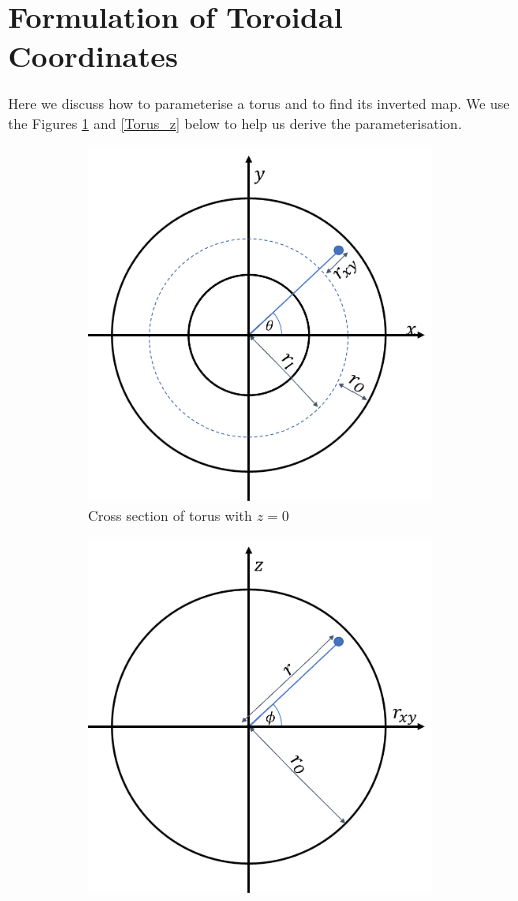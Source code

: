 \documentclass[12pt]{ociamthesis}
\begin{document}
\section{Formulation of Toroidal Coordinates} \label{Form_Toro}
Here we discuss how to parameterise a torus and to find its inverted map. We use the Figures \ref{Torus_XY} and \ref{Torus_z} below to help us derive the parameterisation.
\begin{figure}[H]
 \begin{subfigure}{0.5\textwidth}
     \includegraphics[width=\textwidth]{Pics/TorusCordsXY.png}
     \caption{Cross section of torus with $z=0$}
     \label{Torus_XY}
 \end{subfigure}
 \hfill
 \begin{subfigure}{0.5\textwidth}
     \includegraphics[width=\textwidth]{Pics/TorusCordsr_XYZ.png}

\end{subfigure}
\end{figure}
\end{document}
